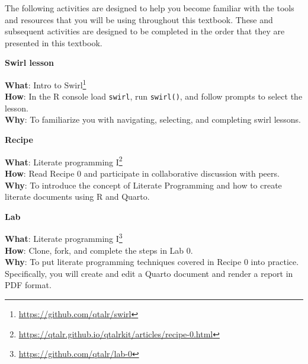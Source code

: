 \documentclass[
  letterpaper,
]{latex/krantz}
\DeclareRobustCommand{\href}[2]{#2\footnote{\url{#1}}}
\begin{document}
The following activities are designed to help you become familiar with
the tools and resources that you will be using throughout this textbook.
These and subsequent activities are designed to be completed in the
order that they are presented in this textbook.

\begin{tcolorbox}[enhanced jigsaw, left=2mm, arc=.35mm, colback=white, rightrule=.15mm, toprule=.15mm, breakable, leftrule=.75mm, opacityback=0, bottomrule=.15mm]

\textbf{ Swirl lesson}

\textbf{What}: \href{https://github.com/qtalr/swirl}{Intro to Swirl}\\
\textbf{How}: In the R console load \texttt{swirl}, run
\texttt{swirl()}, and follow prompts to select the lesson.\\
\textbf{Why}: To familiarize you with navigating, selecting, and
completing swirl lessons.

\end{tcolorbox}

\begin{tcolorbox}[enhanced jigsaw, left=2mm, arc=.35mm, colback=white, rightrule=.15mm, toprule=.15mm, breakable, leftrule=.75mm, opacityback=0, bottomrule=.15mm]

\textbf{ Recipe}

\textbf{What}:
\href{https://qtalr.github.io/qtalrkit/articles/recipe-0.html}{Literate
programming I}\\
\textbf{How}: Read Recipe 0 and participate in collaborative discussion
with peers.\\
\textbf{Why}: To introduce the concept of Literate Programming and how
to create literate documents using R and Quarto.

\end{tcolorbox}

\begin{tcolorbox}[enhanced jigsaw, left=2mm, arc=.35mm, colback=white, rightrule=.15mm, toprule=.15mm, breakable, leftrule=.75mm, opacityback=0, bottomrule=.15mm]

\textbf{ Lab}

\textbf{What}: \href{https://github.com/qtalr/lab-0}{Literate
programming I}\\
\textbf{How}: Clone, fork, and complete the steps in Lab 0.\\
\textbf{Why}: To put literate programming techniques covered in Recipe 0
into practice. Specifically, you will create and edit a Quarto document
and render a report in PDF format.

\end{tcolorbox}
\end{document}
